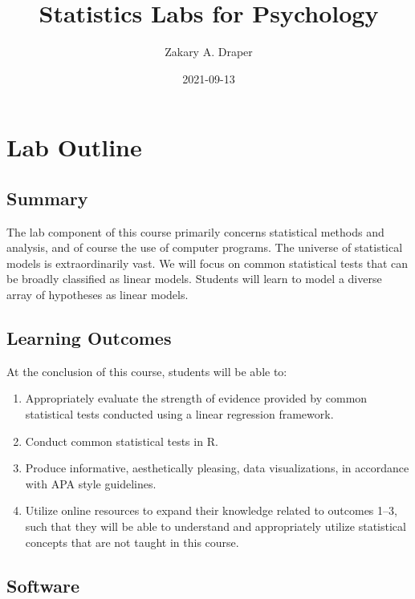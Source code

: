 \documentclass[
]{book}
\title{Statistics Labs for Psychology}
\author{Zakary A. Draper}
\date{2021-09-13}
\providecommand{\tightlist}{%
  \setlength{\itemsep}{0pt}\setlength{\parskip}{0pt}}
\begin{document}
\maketitle

{
\setcounter{tocdepth}{1}
\tableofcontents
}
\hypertarget{lab-outline}{%
\chapter*{Lab Outline}\label{lab-outline}}

\hypertarget{summary}{%
\section*{Summary}\label{summary}}

The lab component of this course primarily concerns statistical methods and analysis, and of course the use of computer programs. The universe of statistical models is extraordinarily vast. We will focus on common statistical tests that can be broadly classified as linear models. Students will learn to model a diverse array of hypotheses as linear models.

\hypertarget{learning-outcomes}{%
\section*{Learning Outcomes}\label{learning-outcomes}}

At the conclusion of this course, students will be able to:

\begin{enumerate}
\def\labelenumi{\arabic{enumi}.}
\tightlist
\item
  Appropriately evaluate the strength of evidence provided by common statistical tests conducted using a linear regression framework.
\item
  Conduct common statistical tests in R.
\item
  Produce informative, aesthetically pleasing, data visualizations, in accordance with APA style guidelines.
\item
  Utilize online resources to expand their knowledge related to outcomes 1--3, such that they will be able to understand and appropriately utilize statistical concepts that are not taught in this course.
\end{enumerate}

\hypertarget{software}{%
\section*{Software}\label{software}}
\end{document}
